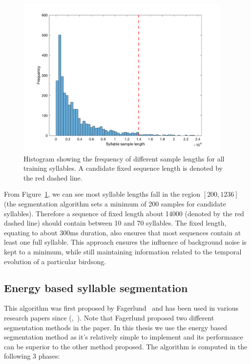 \begin{figure}[ht]
  \centering
  \includegraphics[width=0.95\textwidth]{figures/syllable_sample_length.png}
  \caption{Histogram showing the frequency of different sample lengths for all
  training syllables. A candidate fixed sequence length is denoted by the red
dashed line.}\label{fig:syllable_sample_lengths}
\end{figure}

From Figure~\ref{fig:syllable_sample_lengths}, we can see most syllable lengths
fall in the region $\left[ 200, 1236 \right]$ (the segmentation algorithm sets a
minimum of 200 samples for candidate syllables). Therefore a sequence of fixed
length about 14000 (denoted by the red dashed line) should contain between 10
and 70 syllables. The fixed length, equating to about 300ms duration, also
ensures that most sequences contain at least one full syllable. This approach
ensures the influence of background noise is kept to a minimum, while still
maintaining information related to the temporal evolution of a particular
birdsong.

\subsection{Energy based syllable segmentation}\label{ssec:syllable_seg}

This algorithm was first proposed by Fagerlund~\cite{fagerlund2004automatic}
and has been used in various research papers since
(\cite{somervuo2006parametric},~\cite{ramashini2022robust}). Note that Fagerlund
proposed two different segmentation methods in the paper. In this thesis we use
the energy based segmentation method as it's relatively
simple to implement and its performance can be superior to the other method
proposed. The algorithm is computed in the following 3 phases:

